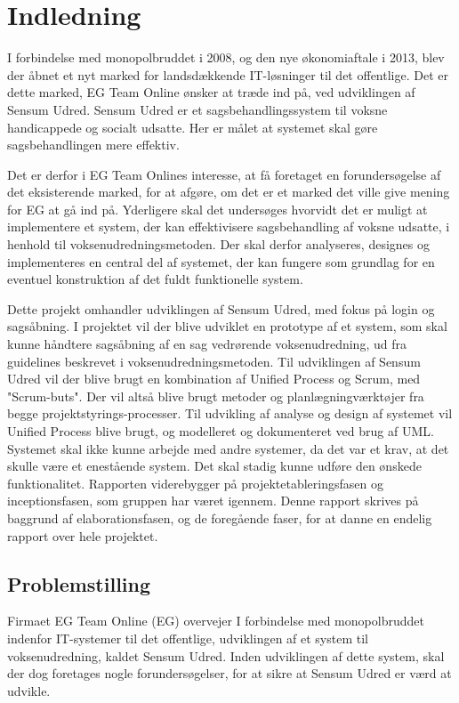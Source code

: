 \documentclass[../main.tex]{subfiles}
\begin{document}
\section{Indledning} \label{indledning}
I forbindelse med monopolbruddet i 2008, og den nye økonomiaftale i 2013, blev der åbnet et nyt marked for landsdækkende IT-løsninger til det offentlige. Det er dette marked, EG Team Online ønsker at træde ind på, ved udviklingen af Sensum Udred. Sensum Udred er et sagsbehandlingssystem til voksne handicappede og socialt udsatte. Her er målet at systemet skal gøre sagsbehandlingen mere effektiv. 

Det er derfor i EG Team Onlines interesse, at få foretaget en forundersøgelse af det eksisterende marked, for at afgøre, om det er et marked det ville give mening for EG at gå ind på. Yderligere skal det undersøges hvorvidt det er muligt at implementere et system, der kan effektivisere sagsbehandling af voksne udsatte, i henhold til voksenudredningsmetoden. Der skal derfor analyseres, designes og implementeres en central del af systemet, der kan fungere som grundlag for en eventuel konstruktion af det fuldt funktionelle system.

Dette projekt omhandler udviklingen af Sensum Udred, med fokus på login og sagsåbning. I projektet vil der blive udviklet en prototype af et system, som skal kunne håndtere sagsåbning af en sag vedrørende voksenudredning, ud fra guidelines beskrevet i voksenudredningsmetoden. Til udviklingen af Sensum Udred vil der blive brugt en kombination af Unified Process og Scrum, med "Scrum-buts". Der vil altså blive brugt metoder og planlægningværktøjer fra begge projektstyrings-processer. Til udvikling af analyse og design af systemet vil Unified Process blive brugt, og modelleret og dokumenteret ved brug af UML. Systemet skal ikke kunne arbejde med andre systemer, da det var et krav, at det skulle være et enestående system. Det skal stadig kunne udføre den ønskede funktionalitet. Rapporten viderebygger på projektetableringsfasen og inceptionsfasen, som gruppen har været igennem. Denne rapport skrives på baggrund af elaborationsfasen, og de foregående faser, for at danne en endelig rapport over hele projektet.

\subsection{Problemstilling}

Firmaet EG Team Online (EG) overvejer I forbindelse med monopolbruddet indenfor IT-systemer til det offentlige, udviklingen af et system til voksenudredning, kaldet Sensum Udred. 
Inden udviklingen af dette system, skal der dog foretages nogle forundersøgelser, for at sikre at Sensum Udred er værd at udvikle. 
\end{document}

